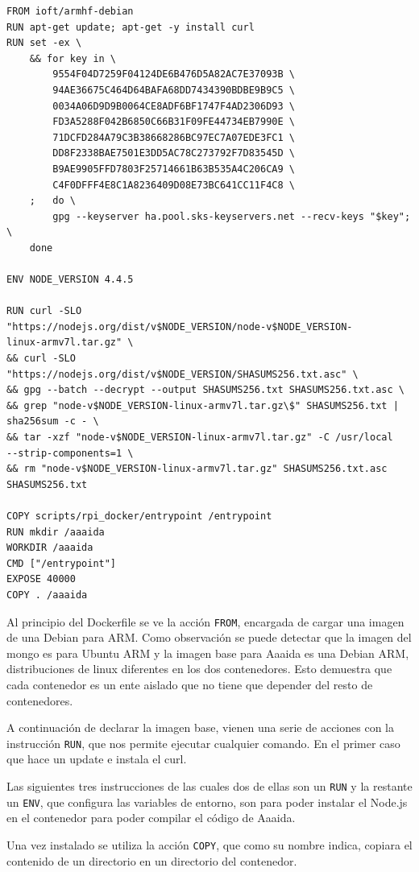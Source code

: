 \begin{verbatim}
FROM ioft/armhf-debian
RUN apt-get update; apt-get -y install curl
RUN set -ex \  
	&& for key in \    
		9554F04D7259F04124DE6B476D5A82AC7E37093B \ 
        94AE36675C464D64BAFA68DD7434390BDBE9B9C5 \
        0034A06D9D9B0064CE8ADF6BF1747F4AD2306D93 \ 
        FD3A5288F042B6850C66B31F09FE44734EB7990E \    
        71DCFD284A79C3B38668286BC97EC7A07EDE3FC1 \    
        DD8F2338BAE7501E3DD5AC78C273792F7D83545D \    
        B9AE9905FFD7803F25714661B63B535A4C206CA9 \    
        C4F0DFFF4E8C1A8236409D08E73BC641CC11F4C8 \  
	; 	do \  
		gpg --keyserver ha.pool.sks-keyservers.net --recv-keys "$key"; \  
	done

ENV NODE_VERSION 4.4.5

RUN curl -SLO 
"https://nodejs.org/dist/v$NODE_VERSION/node-v$NODE_VERSION-
linux-armv7l.tar.gz" \  
&& curl -SLO "https://nodejs.org/dist/v$NODE_VERSION/SHASUMS256.txt.asc" \  
&& gpg --batch --decrypt --output SHASUMS256.txt SHASUMS256.txt.asc \  
&& grep "node-v$NODE_VERSION-linux-armv7l.tar.gz\$" SHASUMS256.txt | 
sha256sum -c - \  
&& tar -xzf "node-v$NODE_VERSION-linux-armv7l.tar.gz" -C /usr/local 
--strip-components=1 \  
&& rm "node-v$NODE_VERSION-linux-armv7l.tar.gz" SHASUMS256.txt.asc 
SHASUMS256.txt

COPY scripts/rpi_docker/entrypoint /entrypoint
RUN mkdir /aaaida
WORKDIR /aaaida
CMD ["/entrypoint"]
EXPOSE 40000
COPY . /aaaida
\end{verbatim}

Al principio del Dockerfile se ve la acción \texttt{FROM}, encargada de cargar una imagen de una Debian para ARM. Como observación se puede detectar que la imagen del mongo es para Ubuntu ARM y la imagen base para Aaaida es una Debian ARM, distribuciones de linux diferentes en los dos contenedores. Esto demuestra que cada contenedor es un ente aislado que no tiene que depender del resto de contenedores.
 
A continuación de declarar la imagen base, vienen una serie de acciones con la instrucción \texttt{RUN}, que nos permite ejecutar cualquier comando. En el primer caso que hace un update e instala el curl.
 
Las siguientes tres instrucciones de las cuales dos de ellas son un \texttt{RUN} y la restante un \texttt{ENV}, que configura las variables de entorno, son para poder instalar el Node.js en el contenedor para poder compilar el código de Aaaida.
 
Una vez instalado se utiliza la acción \texttt{COPY}, que como su nombre indica, copiara el contenido de un directorio en un directorio del contenedor.

